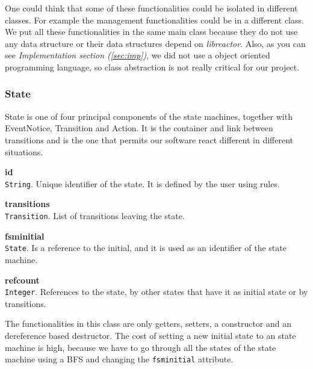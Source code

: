 One could think that some of these functionalities could be isolated in different classes. For example the management functionalities
could be in a different class.\\
We put all these functionalities in the same main class because they do not use any data structure or their data structures depend on 
\emph{libreactor}. Also, as you can see \emph{Implementation section (\ref{sec:imp})}, we did not use a object oriented programming 
language, so class abstraction is not really critical for our project.

\subsubsection{State}
State is one of four principal components of the state machines, together with EventNotice, Transition and Action. It is the container and 
link between transitions and is the one that permits our software react different in different situations.\\
\begin{list}{-}{The attributes are:}
  \item {\bf id}\\
    \texttt{String}. Unique identifier of the state. It is defined by the user using rules.
  \item {\bf transitions}\\
    \texttt{Transition}. List of transitions leaving the state.
  \item {\bf fsminitial}\\
    \texttt{State}. Is a reference to the initial, and it is used as an identifier of the state machine.
  \item {\bf refcount}\\
    \texttt{Integer}. References to the state, by other states that have it as initial state or by transitions.
\end{list}
The functionalities in this class are only getters, setters, a constructor and an dereference based destructor. The cost of setting a new 
initial state to an state machine is high, because we have to go through all the states of the state machine using a BFS and changing the
\texttt{fsminitial} attribute.
